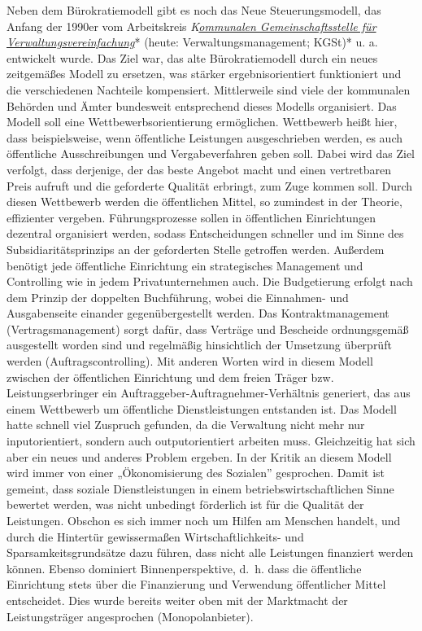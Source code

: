 \documentclass[
  letterpaper,
]{book}
\begin{document}
Neben dem Bürokratiemodell gibt es noch das Neue Steuerungsmodell, das
Anfang der 1990er vom Arbeitskreis
\emph{K}\href{https://de.wikipedia.org/wiki/Kommunale_Gemeinschaftsstelle_f\%C3\%BCr_Verwaltungsmanagement}{\emph{ommunalen
Gemeinschaftsstelle für Verwaltungsvereinfachung}}* (heute:
Verwaltungsmanagement; KGSt)* u. a. entwickelt wurde. Das Ziel war, das
alte Bürokratiemodell durch ein neues zeitgemäßes Modell zu ersetzen,
was stärker ergebnisorientiert funktioniert und die verschiedenen
Nachteile kompensiert. Mittlerweile sind viele der kommunalen Behörden
und Ämter bundesweit entsprechend dieses Modells organisiert. Das Modell
soll eine Wettbewerbsorientierung ermöglichen. Wettbewerb heißt hier,
dass beispielsweise, wenn öffentliche Leistungen ausgeschrieben werden,
es auch öffentliche Ausschreibungen und Vergabeverfahren geben soll.
Dabei wird das Ziel verfolgt, dass derjenige, der das beste Angebot
macht und einen vertretbaren Preis aufruft und die geforderte Qualität
erbringt, zum Zuge kommen soll. Durch diesen Wettbewerb werden die
öffentlichen Mittel, so zumindest in der Theorie, effizienter vergeben.
Führungsprozesse sollen in öffentlichen Einrichtungen dezentral
organisiert werden, sodass Entscheidungen schneller und im Sinne des
Subsidiaritätsprinzips an der geforderten Stelle getroffen werden.
Außerdem benötigt jede öffentliche Einrichtung ein strategisches
Management und Controlling wie in jedem Privatunternehmen auch. Die
Budgetierung erfolgt nach dem Prinzip der doppelten Buchführung, wobei
die Einnahmen- und Ausgabenseite einander gegenübergestellt werden. Das
Kontraktmanagement (Vertragsmanagement) sorgt dafür, dass Verträge und
Bescheide ordnungsgemäß ausgestellt worden sind und regelmäßig
hinsichtlich der Umsetzung überprüft werden (Auftragscontrolling). Mit
anderen Worten wird in diesem Modell zwischen der öffentlichen
Einrichtung und dem freien Träger bzw. Leistungserbringer ein
Auftraggeber-Auftragnehmer-Verhältnis generiert, das aus einem
Wettbewerb um öffentliche Dienstleistungen entstanden ist. Das Modell
hatte schnell viel Zuspruch gefunden, da die Verwaltung nicht mehr nur
inputorientiert, sondern auch outputorientiert arbeiten muss.
Gleichzeitig hat sich aber ein neues und anderes Problem ergeben. In der
Kritik an diesem Modell wird immer von einer „Ökonomisierung des
Sozialen'' gesprochen. Damit ist gemeint, dass soziale Dienstleistungen
in einem betriebswirtschaftlichen Sinne bewertet werden, was nicht
unbedingt förderlich ist für die Qualität der Leistungen. Obschon es
sich immer noch um Hilfen am Menschen handelt, und durch die Hintertür
gewissermaßen Wirtschaftlichkeits- und Sparsamkeitsgrundsätze dazu
führen, dass nicht alle Leistungen finanziert werden können. Ebenso
dominiert Binnenperspektive, d.~h. dass die öffentliche Einrichtung
stets über die Finanzierung und Verwendung öffentlicher Mittel
entscheidet. Dies wurde bereits weiter oben mit der Marktmacht der
Leistungsträger angesprochen (Monopolanbieter).
\end{document}
